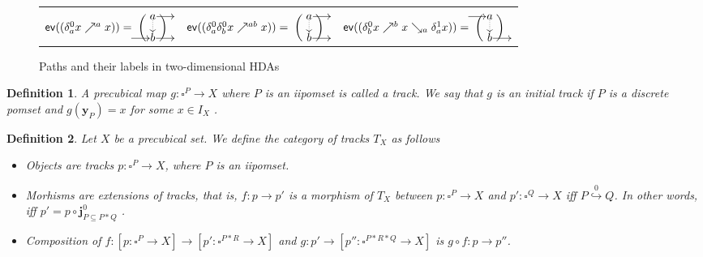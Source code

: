 \documentclass[11pt,a4paper,oldfontcommands]{memoir}
\makeatletter
\newcommand*\ev{\textup{\textsf{ev}}}
\newcommand*\pobj[1]{\square^{#1}}
\newcommand*\jneda{\mathbf{j}}
\newcommand\pomsetwop[4]{%
  \vcenter{\xymatrix@1@R=#1@C=#2@M=#3{#4}}%
}
\newcommand\ipomset[2][1.5]{%
  \hspace*{.6em}%
  \left(%
    \hspace*{-#1em}%
    \pomsetwop{2.7ex}{#1em}{1pt}{#2}%
    \hspace*{-#1em}%
  \right)%
  \hspace*{.6em}%
}
\newcommand{\ininc}{\stackrel{0}{\hookrightarrow} }
\newtheorem{definition}{Definition}
\newtheorem{proposition}[definition]{Proposition}
\makeatother
\begin{document}
\begin{figure}
\begin{tabular}{ccc}
\begin{tikzpicture}[x=1.5cm, y=1.5cm]
      
    \end{tikzpicture}
    \\
     $\ev(( \delta_a^0 x \nearrow^a x))= \!\!\ipomset{ & a \ar@{.>}[d]
      \ar[r] & \\ \ar[r] & b \ar[r] &}$ &
    $\ev(( \delta_a^0 \delta_b^0 x \nearrow^{a b } x))= \!\!\ipomset{ & a
      \ar@{.>}[d] \ar[r] & \\ & b \ar[r] &}$ &
   
    $\ev(( \delta_b^0 x \nearrow^b x \searrow_a \delta_a^1 x))= \!\!\ipomset{ \ar[r] & a \ar@{.>}[d]
      \\ & b \ar[r] &}$
  \end{tabular}
  \bigskip
  \caption{Paths and their labels in two-dimensional HDAs }
  \label{fig:label-iface}
\end{figure}
\begin{definition} \label{def: track}
    A precubical map $g: \square^P \to X$ where $P$ is an iipomset is called a track. We say that $g$ is an initial track if $P$ is a discrete pomset and $g(\mathbf{y}_P) = x$ for some $x\in I_X$  .
\end{definition}
\begin{definition}
    Let $X$ be a precubical set. We define the category of tracks $T_X$ as follows
    \begin{itemize}
        \item Objects are tracks $p: \pobj{P} \to X$, where $P$ is an iipomset.
        \item Morhisms are extensions of tracks, that is, $f:p \to p'$ is a morphism of $T_X$ between $p:\pobj{P} \to X$ and $p':\pobj{Q} \to X$ iff $P \ininc Q$. In other words, iff $p'=p \circ \jneda^0_{P\subseteq P*Q}$ .
        \item Composition of $f: [p:\pobj{P} \to X] \to [p':\pobj{P*R} \to X]$ and $g: p' \to [p'':\pobj{P*R*Q} \to X]$ is $g \circ f: p\to p''$.
    \end{itemize}
\end{definition}


\end{document}
